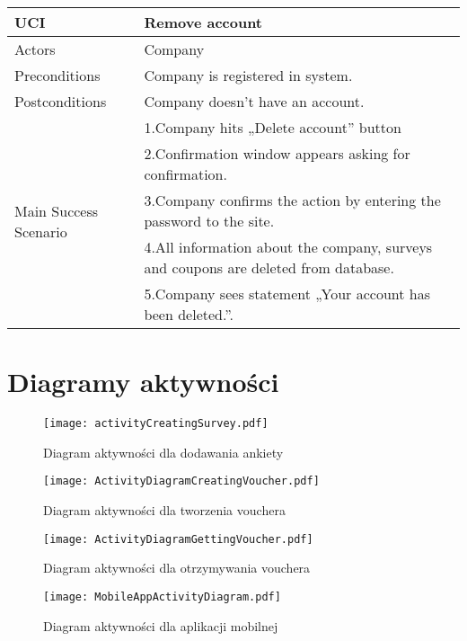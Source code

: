 	\begin{table}[H]
	\centering
	\sffamily\captionsetup{justification=raggedright,singlelinecheck=false,position = below, font = sf}
	\begin{tabular}{|m{3.5cm}|m{11cm}|}
	\hline 
	UCI & Remove account \\
	\hline
	Actors & Company \\
	\hline
	Preconditions & Company is registered in system. \\
	\hline
	Postconditions & Company doesn’t have an account. \\	
	\hline
	\multirow{5}{*}{Main Success Scenario} & 1.Company hits „Delete account” button \\
	\cline{2-2}
	& 2.Confirmation window appears asking for confirmation. \\
	\cline{2-2}
	& 3.Company confirms the action by entering the password to the site. \\
	\cline{2-2}
	& 4.All information about the company, surveys and coupons are deleted from database. \\
	\cline{2-2}
	& 5.Company sees statement „Your account has been deleted.”. \\
	\hline
	\end{tabular}
\end{table}

\section{Diagramy aktywności}

\begin{figure}[htbp]
  \centering
  \texttt{[image: activityCreatingSurvey.pdf]}
  \caption{Diagram aktywności dla dodawania ankiety}
\end{figure}
\clearpage

\begin{figure}[htbp]
  \centering
  \texttt{[image: ActivityDiagramCreatingVoucher.pdf]}
  \caption{Diagram aktywności dla tworzenia vouchera}
\end{figure}
\clearpage

\begin{figure}[htbp]
  \centering
  \texttt{[image: ActivityDiagramGettingVoucher.pdf]}
  \caption{Diagram aktywności dla otrzymywania vouchera}
\end{figure}
\clearpage


\begin{figure}[htbp]
  \centering
  \texttt{[image: MobileAppActivityDiagram.pdf]}
  \caption{Diagram aktywności dla aplikacji mobilnej}
\end{figure}

